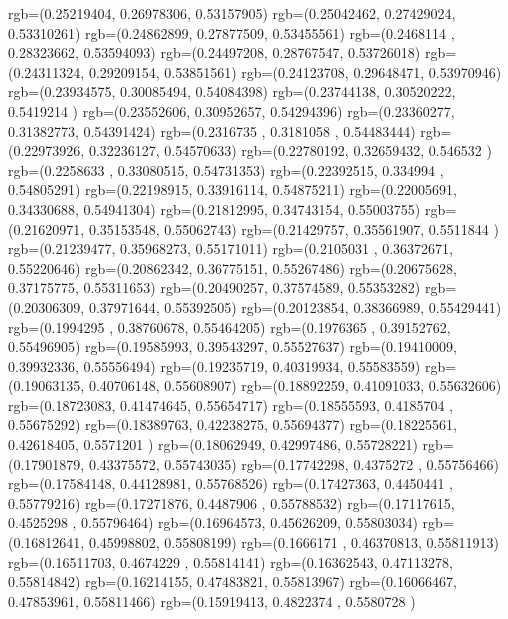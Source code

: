 {{{      rgb=(0.25219404,  0.26978306,  0.53157905)
      rgb=(0.25042462,  0.27429024,  0.53310261)
      rgb=(0.24862899,  0.27877509,  0.53455561)
      rgb=(0.2468114 ,  0.28323662,  0.53594093)
      rgb=(0.24497208,  0.28767547,  0.53726018)
      rgb=(0.24311324,  0.29209154,  0.53851561)
      rgb=(0.24123708,  0.29648471,  0.53970946)
      rgb=(0.23934575,  0.30085494,  0.54084398)
      rgb=(0.23744138,  0.30520222,  0.5419214 )
      rgb=(0.23552606,  0.30952657,  0.54294396)
      rgb=(0.23360277,  0.31382773,  0.54391424)
      rgb=(0.2316735 ,  0.3181058 ,  0.54483444)
      rgb=(0.22973926,  0.32236127,  0.54570633)
      rgb=(0.22780192,  0.32659432,  0.546532  )
      rgb=(0.2258633 ,  0.33080515,  0.54731353)
      rgb=(0.22392515,  0.334994  ,  0.54805291)
      rgb=(0.22198915,  0.33916114,  0.54875211)
      rgb=(0.22005691,  0.34330688,  0.54941304)
      rgb=(0.21812995,  0.34743154,  0.55003755)
      rgb=(0.21620971,  0.35153548,  0.55062743)
      rgb=(0.21429757,  0.35561907,  0.5511844 )
      rgb=(0.21239477,  0.35968273,  0.55171011)
      rgb=(0.2105031 ,  0.36372671,  0.55220646)
      rgb=(0.20862342,  0.36775151,  0.55267486)
      rgb=(0.20675628,  0.37175775,  0.55311653)
      rgb=(0.20490257,  0.37574589,  0.55353282)
      rgb=(0.20306309,  0.37971644,  0.55392505)
      rgb=(0.20123854,  0.38366989,  0.55429441)
      rgb=(0.1994295 ,  0.38760678,  0.55464205)
      rgb=(0.1976365 ,  0.39152762,  0.55496905)
      rgb=(0.19585993,  0.39543297,  0.55527637)
      rgb=(0.19410009,  0.39932336,  0.55556494)
      rgb=(0.19235719,  0.40319934,  0.55583559)
      rgb=(0.19063135,  0.40706148,  0.55608907)
      rgb=(0.18892259,  0.41091033,  0.55632606)
      rgb=(0.18723083,  0.41474645,  0.55654717)
      rgb=(0.18555593,  0.4185704 ,  0.55675292)
      rgb=(0.18389763,  0.42238275,  0.55694377)
      rgb=(0.18225561,  0.42618405,  0.5571201 )
      rgb=(0.18062949,  0.42997486,  0.55728221)
      rgb=(0.17901879,  0.43375572,  0.55743035)
      rgb=(0.17742298,  0.4375272 ,  0.55756466)
      rgb=(0.17584148,  0.44128981,  0.55768526)
      rgb=(0.17427363,  0.4450441 ,  0.55779216)
      rgb=(0.17271876,  0.4487906 ,  0.55788532)
      rgb=(0.17117615,  0.4525298 ,  0.55796464)
      rgb=(0.16964573,  0.45626209,  0.55803034)
      rgb=(0.16812641,  0.45998802,  0.55808199)
      rgb=(0.1666171 ,  0.46370813,  0.55811913)
      rgb=(0.16511703,  0.4674229 ,  0.55814141)
      rgb=(0.16362543,  0.47113278,  0.55814842)
      rgb=(0.16214155,  0.47483821,  0.55813967)
      rgb=(0.16066467,  0.47853961,  0.55811466)
      rgb=(0.15919413,  0.4822374 ,  0.5580728 )
}}}
